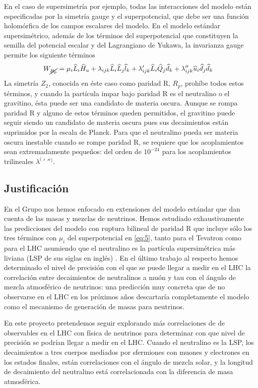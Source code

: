 En el caso de supersimetría por ejemplo, todas las interacciones del
modelo están especificadas por la simetría gauge y el superpotencial,
que debe ser una función holomórfica de los campos escalares del
modelo. En el modelo estándar supersimétrico, además de los términos
del superpotencial que constituyen la semilla del potencial escalar y
del Lagrangiano de Yukawa, la invarianza gauge permite los siguiente
términos
\begin{equation}
  \label{eq:5}
  W_{\cancel{R_p}} = \mu_i\widehat{L}_i\widehat{H}_u + 
  \lambda_{i j k}\widehat{L}_i\widehat{L}_j\widehat{l}_k +
  \lambda'_{i j k}\widehat{L}_i\widehat{Q}_j\widehat{d}_k + 
  \lambda''_{ijk}\widehat{u}_i\widehat{d}_j\widehat{d}_k\,
\end{equation}
La simetría $Z_2$, conocida en éste caso como paridad R, $R_p$,
prohíbe todos estos términos, y cuando la partícula impar bajo paridad
R es el neutralino o el gravitino, ésta puede ser una candidato de
materia oscura. Aunque se rompa paridad R y alguno de estos términos
queden permitidos, el gravitino puede seguir siendo un candidato de
materia oscura pues sus decaimientos están suprimidos por la escala de
Planck. Para que el neutralino pueda ser materia oscura inestable
cuando se rompe paridad R, se requiere que los acoplamientos sean
extremadamente pequeños: del orden de $10^{-24}$ para los
acoplamientos trilineales ${\lambda^{(\ }}'\;''{}^)$.


\subsection{Justificación}

En el Grupo nos hemos enfocado en extensiones del modelo estándar que
dan cuenta de las masas y mezclas de neutrinos. Hemos estudiado
exhaustivamente las predicciones del modelo  con ruptura bilineal de
paridad R que incluye sólo los tres términos con $\mu_i$ del
superpotencial en \eqref{eq:5}, tanto para el Tevatron como para el
LHC asumiendo que el neutralino es la partícula supersimétrica más
liviana (LSP de sus siglas en inglés)
\cite{Magro:2003zb,deCampos:2005ri,deCampos:2007bn,deCampos:2008ic,deCampos:2008re,DeCampos:2010yu}. En
el último trabajo al respecto hemos determinado el nivel de precisión
con el que se puede llegar a medir en el LHC la correlación entre
decaimientos de neutralinos a muón y tau con el ángulo de mezcla
atmosférico de neutrinos: una predicción muy concreta que de no
observarse en el LHC en los próximos años descartaría completamente el
modelo como el mecanismo de generación de masas para neutrinos.
\begin{proyecto}
  En este proyecto pretendemos seguir explorando más correlaciones de
  de observables en el LHC con física de neutrinos para determinar con
  que nivel de precisión se podrían llegar a medir en el LHC. Cuando
  el neutralino es la LSP, los decaimientos a tres cuerpos mediados
  por sfermiones con muones y electrones en los estados finales, están
  correlaciones con el ángulo de mezcla solar, y la longitud de
  decaimiento del neutralino está correlacionada con la diferencia de
  masa atmosférica.
\end{proyecto}


